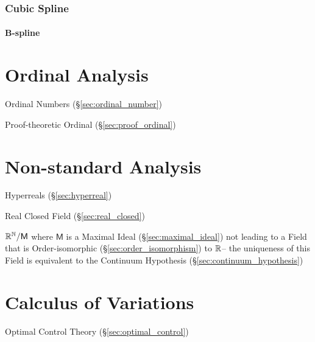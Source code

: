 \subsubsection{Cubic Spline}\label{sec:cubic_spline}

\paragraph{B-spline}\label{sec:b_spline}\hfill



\section{Ordinal Analysis}\label{sec:ordinal_analysis}

Ordinal Numbers (\S\ref{sec:ordinal_number})

Proof-theoretic Ordinal (\S\ref{sec:proof_ordinal})



\section{Non-standard Analysis}\label{sec:nonstandard_analysis}

Hyperreals (\S\ref{sec:hyperreal})

Real Closed Field (\S\ref{sec:real_closed})

$\mathbb{R}^{\mathbb{N}} / \mathsf{M}$ where $\mathsf{M}$ is a Maximal Ideal
(\S\ref{sec:maximal_ideal}) not leading to a Field that is
Order-isomorphic (\S\ref{sec:order_isomorphism}) to $\mathbb{R}$-- the
uniqueness of this Field is equivalent to the Continuum Hypothesis
(\S\ref{sec:continuum_hypothesis})



\section{Calculus of Variations}\label{sec:calculus_of_variations}

\fist Optimal Control Theory (\S\ref{sec:optimal_control})




